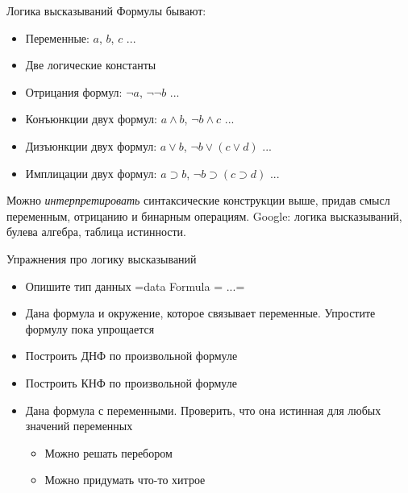 \documentclass[
  xcolor={svgnames},
  hyperref={colorlinks,citecolor=DeepPink4,linkcolor=DarkRed,urlcolor=DarkBlue}]{beamer}
\begin{document}
\begin{frame}[fragile]{Логика высказываний}
Формулы бывают:
\begin{itemize}
 \item Переменные: $a$, $b$, $c$ ...
 \item Две логические константы
 \item Отрицания формул:  $\neg a$, $\neg\neg b$ ...
 \item Конъюнкции двух формул: $a \wedge b$, $\neg b \wedge c$ ...
 \item Дизъюнкции двух формул: $a \vee b$, $\neg b \vee (c \vee d)$ ...
 \item Имплицации двух формул: $a \supset b$, $\neg b \supset (c \supset d)$ ...
\end{itemize}
\pause
Можно \textit{интерпретировать} синтаксические конструкции выше, придав смысл переменным, отрицанию и бинарным операциям. Google: логика высказываний, булева алгебра, таблица истинности.
\end{frame}

\begin{frame}[fragile]{Упражнения про логику высказываний}
\begin{itemize}
 \item Опишите тип данных \hsinline=data Formula = ...=
 \item Дана формула и окружение, которое связывает переменные. Упростите формулу пока упрощается
 \item Построить ДНФ по произвольной формуле
 \item Построить КНФ по произвольной формуле
 \item Дана формула с переменными. Проверить, что она истинная для любых значений переменных
  \begin{itemize}
   \item Можно решать перебором
   \item Можно придумать что-то хитрое
  \end{itemize}
\end{itemize}
\end{frame}
\end{document}
